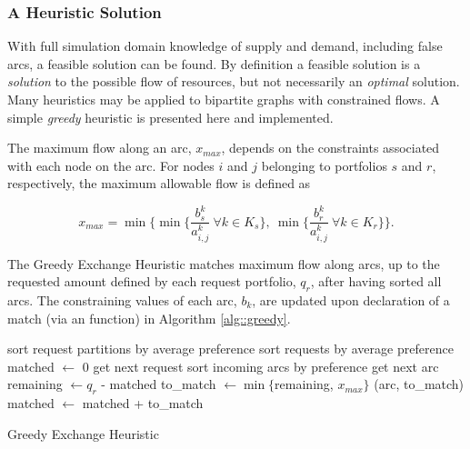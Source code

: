 \subsubsection{A Heuristic Solution}\label{abm:dre:nfctp:heur}

With full simulation domain knowledge of supply and demand, including false
arcs, a feasible solution can be found. By definition a feasible solution is a
\textit{solution} to the possible flow of resources, but not necessarily an
\textit{optimal} solution. Many heuristics may be applied to bipartite graphs
with constrained flows. A simple \textit{greedy} heuristic is presented here
and implemented. 

The maximum flow along an arc, $x_{max}$, depends on the constraints associated
with each node on the arc. For nodes $i$ and $j$ belonging to portfolios $s$ and
$r$, respectively, the maximum allowable flow is defined as

\begin{equation}
  x_{max} = \min 
        \lbrace 
        \min \lbrace \frac{b^k_s}{a^k_{i, j}} 
        \: \forall k \in K_s \rbrace, 
        \: \min \lbrace \frac{b^k_r}{a^k_{i, j}} 
        \: \forall k \in K_r \rbrace
        \rbrace.
\end{equation}

The Greedy Exchange Heuristic matches maximum flow along arcs, up to the
requested amount defined by each request portfolio, $q_r$, after having sorted
all arcs. The constraining values of each arc, $b_k$, are updated upon
declaration of a match (via an  function) in Algorithm
\ref{alg::greedy}.

\begin{algorithm}[!h]
 \SetAlgoLined
 sort request partitions by average preference\;
  {
   sort requests by average preference\;
   matched $\leftarrow$ 0\;        
    {
     get next request\;
     sort incoming arcs by preference\;
      {
       get next arc\;
       remaining $\leftarrow q_r$ - matched\;
       to\_match $\leftarrow \min \lbrace$remaining, $x_{max} \rbrace$\;
       (arc, to\_match)\;
       matched $\leftarrow$ matched + to\_match\;
     }
   }
 }
 \caption{Greedy Exchange Heuristic}\label{alg::greedy}
\end{algorithm}

